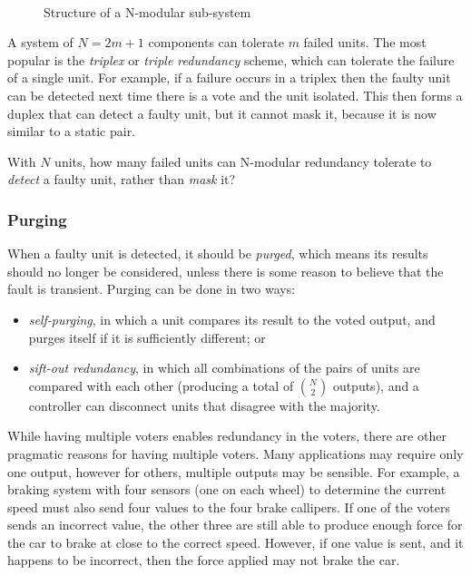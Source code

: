 \begin{figure}[!h]
\centering
{}
~~~~~
\caption{Structure of a N-modular sub-system}
\label{fig:fault-tolerance:n-modular-redundancy}
\end{figure}

A system of \(N = 2m + 1\) components can tolerate \(m\) failed units. The most popular is the \emph{triplex} or \emph{triple redundancy} scheme, which can tolerate the failure of a single unit. For example, if a failure occurs in a triplex then the faulty unit can be detected next time there is a vote and the unit isolated.  This then forms a duplex that can detect a faulty unit, but it cannot mask it, because it is now similar to a static pair.

\begin{exercise}
With \(N\) units, how many failed units can N-modular redundancy tolerate to \emph{detect} a faulty unit, rather than \emph{mask} it?
\end{exercise}

\subsubsection*{Purging}

When a faulty unit is detected, it should be \emph{purged}, which means its results should no longer be considered, unless there is some reason to believe that the fault is transient. Purging can be done in two ways:

\begin{itemize}

 \item \emph{self-purging}, in which a unit compares its result to the voted output, and purges itself if it is sufficiently different; or

 \item \emph{\em sift-out redundancy}, in which all combinations of the pairs of units are compared with each other (producing a total of \({N \choose 2}\) outputs), and a controller can disconnect units that disagree with the majority.

\end{itemize}

While having multiple voters enables redundancy in the voters, there are other pragmatic reasons for  having multiple voters. Many applications may require only one output, however for others, multiple outputs may be sensible. For example, a braking system with four sensors (one on each wheel) to determine the current speed must also send four values to the four brake callipers. If one of the voters sends an incorrect value, the other three are still able to produce enough force for the car to brake at close to the correct speed. However, if one value is sent, and it happens to be incorrect, then the force applied may not brake the car.


